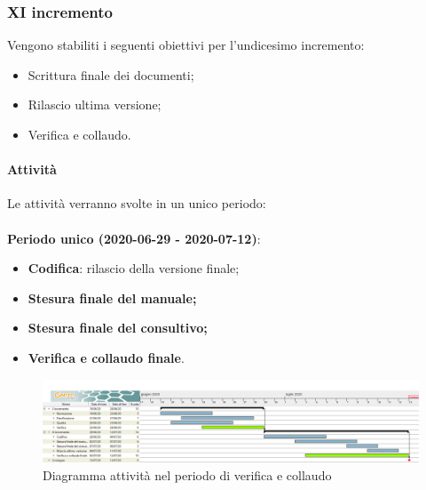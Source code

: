 \documentclass[../piano-di-progetto.tex]{subfiles}
\begin{document}
\subsubsection{XI incremento}
 Vengono stabiliti i seguenti obiettivi per l'undicesimo incremento:
 \begin{itemize}
     \item Scrittura finale dei documenti;
     \item Rilascio ultima versione;
     \item Verifica e collaudo.
 \end{itemize}

\paragraph{Attività}
Le attività verranno svolte in un unico periodo:
\\
\\
\textbf{Periodo unico (2020-06-29 - 2020-07-12)}:
\begin{itemize}
    \item \textbf{Codifica}: rilascio della versione finale;
    \item \textbf{Stesura finale del manuale;}
    \item \textbf{Stesura finale del consultivo;}
    \item \textbf{Verifica e collaudo finale}.
\end{itemize}



\newpage
\begin{landscape}
    \begin{figure}[H]
        \centering
        \includegraphics[width=24cm]{img/verifica.png}
        \caption{Diagramma attività nel periodo di verifica e collaudo}
      \end{figure}
\end{landscape}
\end{document}
